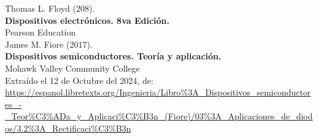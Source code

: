 \documentclass[letter,twoside,11pt]{report}
\begin{document}
\begin{thebibliography}{99}

Thomas L. Floyd (208).\\
\textbf{Dispositivos electrónicos. 8va Edición.}\\
Pearson Education\\

James M. Fiore (2017).\\
\textbf{Dispositivos semiconductores. Teoría y aplicación.}\\
Mohawk Valley Community College\\
Extraído el 12 de Octubre del 2024, de: \\
\url{https://espanol.libretexts.org/Ingenieria/Libro%3A_Dispositivos_semiconductores_-_Teor%C3%ADa_y_Aplicaci%C3%B3n_(Fiore)/03%3A_Aplicaciones_de_diodos/3.2%3A_Rectificaci%C3%B3n}

\end{thebibliography}
\end{document}
